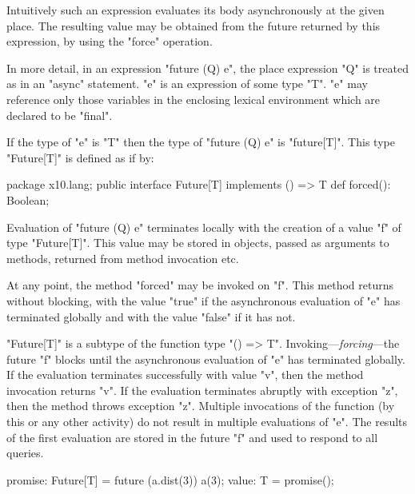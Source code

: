 Intuitively such an expression evaluates its body asynchronously at
the given place. The resulting value may be obtained from the future
returned by this expression, by using the \xcd"force" operation.

In more detail, in an expression \xcd"future (Q) e", the place
expression \xcd"Q" is treated as in an \xcd"async" statement. \xcd"e"
is an expression of some type \xcd"T". \xcd"e" may reference only
those variables in the enclosing lexical environment which are
declared to be \xcd"final".

If the type of \xcd"e" is \xcd"T" then the type of
\xcd"future (Q) e" is \xcd"future[T]".  This 
type \xcd"Future[T]" is defined as if by:
\begin{xten}
package x10.lang;
public interface Future[T] implements () => T {
  def forced(): Boolean;
}
\end{xten}

Evaluation of \xcd"future (Q) e" terminates locally with the creation
of a value \xcd"f" of type \xcd"Future[T]".  This value may be
stored in objects, passed as arguments to methods, returned from
method invocation etc. 

At any point, the method \xcd"forced" may be invoked on \xcd"f". This
method returns without blocking, with the value \xcd"true" if the
asynchronous evaluation of \xcd"e" has terminated globally and with
the value \xcd"false" if it has not.

\xcd"Future[T]" is a subtype of the function type \xcd"() => T".
Invoking---\emph{forcing}---the future \xcd"f" blocks until the
asynchronous evaluation of \xcd"e" has terminated globally. If the
evaluation terminates successfully with value \xcd"v", then the method
invocation returns \xcd"v". If the evaluation terminates abruptly with
exception \xcd"z", then the method throws exception \xcd"z". Multiple
invocations of the function (by this or any other activity) do not
result in multiple evaluations of \xcd"e". The results of the first
evaluation are stored in the future \xcd"f" and used to respond to all
queries.

\begin{example}
\begin{xten}
promise: Future[T] = future (a.dist(3)) a(3);
value: T = promise();
\end{xten}
\end{example}


